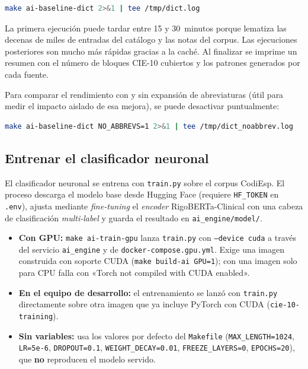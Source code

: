 \begin{lstlisting}[language=bash]
make ai-baseline-dict 2>&1 | tee /tmp/dict.log
\end{lstlisting}

La primera ejecución puede tardar entre 15 y 30~minutos porque lematiza las decenas de miles de entradas del catálogo y las notas del corpus. Las ejecuciones posteriores son mucho más rápidas gracias a la caché. Al finalizar se imprime un resumen con el número de bloques CIE-10 cubiertos y los patrones generados por cada fuente.

Para comparar el rendimiento con y sin expansión de abreviaturas (útil para medir el impacto aislado de esa mejora), se puede desactivar puntualmente:

\begin{lstlisting}[language=bash]
make ai-baseline-dict NO_ABBREVS=1 2>&1 | tee /tmp/dict_noabbrev.log
\end{lstlisting}

\subsection{Entrenar el clasificador neuronal}

El clasificador neuronal se entrena con \texttt{train.py} sobre el corpus CodiEsp. El proceso descarga el modelo base desde Hugging Face (requiere \texttt{HF\_TOKEN} en \texttt{.env}), ajusta mediante \emph{fine-tuning} el \emph{encoder} RigoBERTa-Clinical con una cabeza de clasificación \emph{multi-label} y guarda el resultado en \texttt{ai\_engine/model/}.

\begin{itemize}
 \item \textbf{Con GPU:} \texttt{make ai-train-gpu} lanza \texttt{train.py} con \texttt{--device cuda} a través del servicio \texttt{ai\_engine} y de \texttt{docker-compose.gpu.yml}. Exige una imagen construida con soporte CUDA (\texttt{make build-ai GPU=1}); con una imagen solo para CPU falla con «Torch not compiled with CUDA enabled».
 \item \textbf{En el equipo de desarrollo:} el entrenamiento se lanzó con \texttt{train.py} directamente sobre otra imagen que ya incluye PyTorch con CUDA (\texttt{cie-10-training}).
 \item \textbf{Sin variables:} usa los valores por defecto del \texttt{Makefile} (\texttt{MAX\_LENGTH=1024}, \texttt{LR=5e-6}, \texttt{DROPOUT=0.1}, \texttt{WEIGHT\_DECAY=0.01}, \texttt{FREEZE\_LAYERS=0}, \texttt{EPOCHS=20}), que \textbf{no} reproducen el modelo servido.
\end{itemize}

